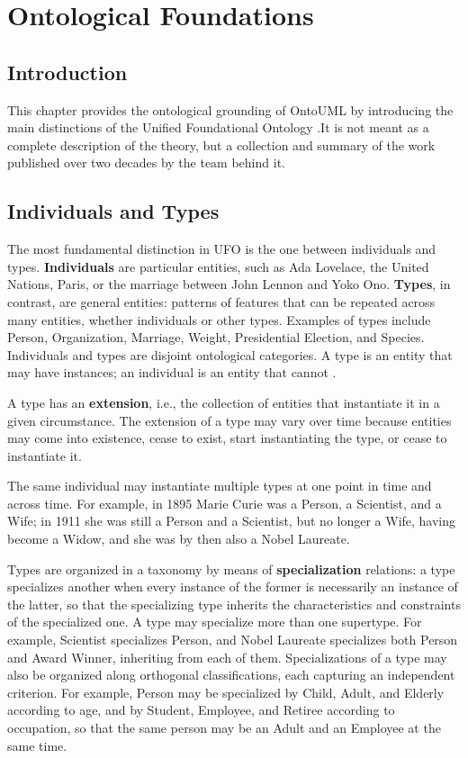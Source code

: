 \chapter{Ontological Foundations}

\section{Introduction}

This chapter provides the ontological grounding of OntoUML by introducing the main distinctions of the Unified Foundational Ontology \cite{ufo_unified_foundational_ontology_2021}.It is not meant as a complete description of the theory, but a collection and summary of the work published over two decades by the team behind it.

\section{Individuals and Types}

The most fundamental distinction in UFO is the one between individuals and types. \textbf{Individuals} are particular entities, such as Ada Lovelace, the United Nations, Paris, or the marriage between John Lennon and Yoko Ono. \textbf{Types}, in contrast, are general entities: patterns of features that can be repeated across many entities, whether individuals or other types. Examples of types include Person, Organization, Marriage, Weight, Presidential Election, and Species. Individuals and types are disjoint ontological categories. A type is an entity that may have instances; an individual is an entity that cannot \cite{types_and_taxonomic_structures_in_conceptual_modeling_2021}.

A type has an \textbf{extension}, i.e., the collection of entities that instantiate it in a given circumstance. The extension of a type may vary over time because entities may come into existence, cease to exist, start instantiating the type, or cease to instantiate it.

The same individual may instantiate multiple types at one point in time and across time. For example, in 1895 Marie Curie was a Person, a Scientist, and a Wife; in 1911 she was still a Person and a Scientist, but no longer a Wife, having become a Widow, and she was by then also a Nobel Laureate.

Types are organized in a taxonomy by means of \textbf{specialization} relations: a type specializes another when every instance of the former is necessarily an instance of the latter, so that the specializing type inherits the characteristics and constraints of the specialized one. A type may specialize more than one supertype. For example, Scientist specializes Person, and Nobel Laureate specializes both Person and Award Winner, inheriting from each of them. Specializations of a type may also be organized along orthogonal classifications, each capturing an independent criterion. For example, Person may be specialized by Child, Adult, and Elderly according to age, and by Student, Employee, and Retiree according to occupation, so that the same person may be an Adult and an Employee at the same time.

